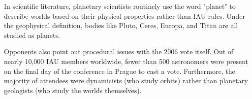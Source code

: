 In scientific literature, planetary scientists routinely use the word "planet" to describe worlds based on their physical properties rather than IAU rules. Under the geophysical definition, bodies like Pluto, Ceres, Europa, and Titan are all studied as planets.


Opponents also point out procedural issues with the 2006 vote itself. Out of nearly 10,000 IAU members worldwide, fewer than 500 astronomers were present on the final day of the conference in Prague to cast a vote. Furthermore, the majority of attendees were dynamicists (who study orbits) rather than planetary geologists (who study the worlds themselves).

